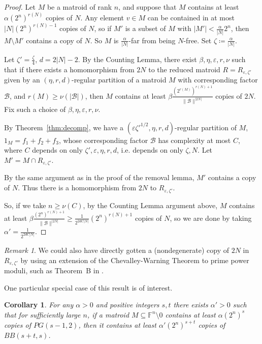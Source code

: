 \documentclass{article}
\theoremstyle{plain}
\newtheorem{cor}[theorem]{Corollary}
\theoremstyle{definition}
\theoremstyle{definition}
\theoremstyle{remark}
\newtheorem*{rem}{Remark}
\numberwithin{equation}{section}
\newcommand{\FF}{\mathbb{F}}
\newcommand{\cB}{\mathcal B}
\begin{document}
\begin{proof}
Let $M$ be a matroid of rank $n$, and suppose that $M$ contains at least $\alpha (2^n)^{r(N)}$ copies of $N$. Any element $v\in M$ can be contained in at most $|N|(2^n)^{r(N)-1}$ copies of $N$, so if $M'$ is a subset of $M$ with $|M'| < \frac{\alpha}{|N|}2^n$, then $M\setminus M'$ contains a copy of $N$. So $M$ is $\frac{\alpha}{|N|}$-far from being $N$-free. Set $\zeta\coloneqq \frac{\alpha}{|N|}$.

Let $\zeta'=\frac{\zeta}{4}$, $d=2|N|-2$. By the Counting Lemma, there exist $\beta, \eta, \varepsilon, r, \nu$ such that if there exists a homomorphism from $2N$ to the reduced matroid $R=R_{\varepsilon,\zeta'}$ given by an $(\eta,r,d)$-regular partition of a matroid $M$ with corresponding factor $\cB$, and $r(M)\geq \nu(|\cB|)$, then $M$ contains at least $\beta \frac{(2^{r(M)})^{r(N)+1}}{\|\cB\|^{|2N|}}$ copies of $2N$. Fix such a choice of $\beta,\eta,\varepsilon,r,\nu$.

By Theorem~\ref{thm:decomp}, we have a $(\varepsilon \zeta'^{1/2},\eta,r,d)$-regular partition of $M$, $1_M=f_1+f_2+f_3$, whose corresponding factor $\cB$ has complexity at most $C$, where $C$ depends on only $\zeta',\varepsilon, \eta,r,d$, i.e. depends on only $\zeta, N$. Let $M'=M\cap R_{\varepsilon,\zeta'}$.

By the same argument as in the proof of the removal lemma, $M'$ contains a copy of $N$. Thus there is a homomorphism from $2N$ to $R_{\varepsilon,\zeta'}$.

So, if we take $n\geq \nu(C)$, by the Counting Lemma argument above, $M$ contains at least $\beta \frac{(2^{n})^{r(N)+1}}{\|\cB\|^{|2N|}}\geq \frac{1}{2^{2dC|N|}}(2^{n})^{r(N)+1}$ copies of $N$, so we are done by taking $\alpha' = \frac{1}{2^{2dC|N|}}$.

\end{proof}

\begin{rem}

We could also have directly gotten a (nondegenerate) copy of $2N$ in $R_{\varepsilon,\zeta'}$ by using an extension of the Chevalley-Warning Theorem to prime power moduli, such as Theorem~B in \cite{powerCW}.

\end{rem}

One particular special case of this result is of interest.

\begin{cor}\label{cor:doublePG}
For any $\alpha>0$ and positive integers $s,t$ there exists $\alpha'>0$ such that for sufficiently large $n$, if a matroid $M\subseteq \FF^n\setminus 0$ contains at least $\alpha (2^n)^{s}$ copies of $PG(s-1,2)$, then it contains at least $\alpha'(2^n)^{s+t}$ copies of $BB(s+t,s)$.
\end{cor}
\end{document}
